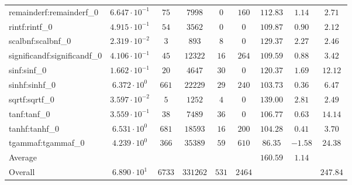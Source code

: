 \begin{tabular}{|l|c|c|c|c|c|c|c|c|}
remainderf:remainderf\_0     & $ 6.647 \cdot 10^{-1} $ & $ 75     $ & $ 7998   $ & $ 0   $ & $ 160  $ & $ 112.83      $ & $ 1.14    $ & $ 2.71    $ \\
rintf:rintf\_0               & $ 4.915 \cdot 10^{-1} $ & $ 54     $ & $ 3562   $ & $ 0   $ & $ 0    $ & $ 109.87      $ & $ 0.90    $ & $ 2.12    $ \\
scalbnf:scalbnf\_0           & $ 2.319 \cdot 10^{-2} $ & $ 3      $ & $ 893    $ & $ 8   $ & $ 0    $ & $ 129.37      $ & $ 2.27    $ & $ 2.46    $ \\
significandf:significandf\_0 & $ 4.106 \cdot 10^{-1} $ & $ 45     $ & $ 12322  $ & $ 16  $ & $ 264  $ & $ 109.59      $ & $ 0.88    $ & $ 3.42    $ \\
sinf:sinf\_0                 & $ 1.662 \cdot 10^{-1} $ & $ 20     $ & $ 4647   $ & $ 30  $ & $ 0    $ & $ 120.37      $ & $ 1.69    $ & $ 12.12   $ \\
sinhf:sinhf\_0               & $ 6.372 \cdot 10^{0}  $ & $ 661    $ & $ 22229  $ & $ 29  $ & $ 240  $ & $ 103.73      $ & $ 0.36    $ & $ 6.47    $ \\
sqrtf:sqrtf\_0               & $ 3.597 \cdot 10^{-2} $ & $ 5      $ & $ 1252   $ & $ 4   $ & $ 0    $ & $ 139.00      $ & $ 2.81    $ & $ 2.49    $ \\
tanf:tanf\_0                 & $ 3.559 \cdot 10^{-1} $ & $ 38     $ & $ 7489   $ & $ 36  $ & $ 0    $ & $ 106.77      $ & $ 0.63    $ & $ 14.14   $ \\
tanhf:tanhf\_0               & $ 6.531 \cdot 10^{0}  $ & $ 681    $ & $ 18593  $ & $ 16  $ & $ 200  $ & $ 104.28      $ & $ 0.41    $ & $ 3.70    $ \\
tgammaf:tgammaf\_0           & $ 4.239 \cdot 10^{0}  $ & $ 366    $ & $ 35389  $ & $ 59  $ & $ 610  $ & $ 86.35       $ & $ -1.58   $ & $ 24.38   $ \\
\hline
Average                      & $                     $ & $        $ & $        $ & $     $ & $      $ & $ 160.59      $ & $ 1.14    $ & $         $ \\
\hline
Overall                      & $ 6.890 \cdot 10^{1}  $ & $ 6733   $ & $ 331262 $ & $ 531 $ & $ 2464 $ & $             $ & $         $ & $ 247.84  $ \\
\hline
\end{tabular}
